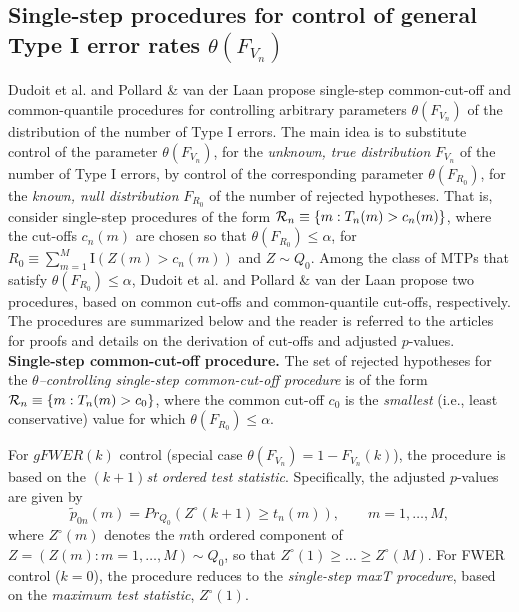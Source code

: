 \documentclass[11pt]{article}
\begin{document}
\subsection{Single-step procedures for control of general Type I error rates $\theta(F_{V_n})$}
\label{anal:mult:s:SS}


Dudoit et al. \cite{DudoitetalMT1SAGMB04} and Pollard \& van der Laan \cite{Pollard&vdLaanJSPI04} propose single-step common-cut-off and common-quantile procedures for controlling arbitrary parameters $\theta(F_{V_n})$ of the distribution of the number of Type I errors. 
The main idea is to substitute control of the parameter $\theta(F_{V_n})$, for the {\em  unknown, true distribution} $F_{V_n}$ of the number of Type I errors, by control of the corresponding parameter $\theta(F_{R_0})$, for the {\em known, null distribution} $F_{R_0}$ of the number of rejected hypotheses. 
That is, consider single-step procedures of the form ${\cal R}_n \equiv \{m: T_n(m)> c_n(m) \}$, 
where the cut-offs $c_n(m)$ are chosen so that $\theta(F_{R_0}) \leq
\alpha$, for $R_0 \equiv \sum_{m=1}^M \mathrm{I}(Z(m) >  c_n(m))$
and $Z \sim Q_0$.
Among the class of MTPs that satisfy $\theta(F_{R_0}) \leq \alpha$, 
Dudoit et al. \cite{DudoitetalMT1SAGMB04} and Pollard \& van der Laan \cite{Pollard&vdLaanJSPI04} propose two procedures, based on common cut-offs and common-quantile cut-offs, respectively. 
The procedures are summarized below and the reader is referred to the articles for proofs and details on the derivation of cut-offs and adjusted $p$-values.\\

\noindent
{\bf Single-step common-cut-off procedure.} The set of rejected hypotheses for the {\em $\theta$--controlling single-step common-cut-off procedure} is of the form
${\cal R}_n \equiv \{m: T_n(m)> c_0 \}$, where the common cut-off $c_0$ is the {\em smallest}  (i.e., least conservative) value for which $\theta(F_{R_0}) \leq \alpha$.

For $gFWER(k)$ control (special case $\theta(F_{V_n}) = 1 - F_{V_n}(k)$), the procedure is based on the {\em $(k+1)$st ordered test statistic}.  
Specifically, the adjusted $p$-values are given by
\begin{equation}\label{anal:mult:e:SScut}
\widetilde{p}_{0n}(m) = Pr_{Q_0} \left(Z^{\circ}(k+1) \geq t_n(m) \right),  \qquad m=1,\ldots, M,
\end{equation}
where $Z^{\circ}(m)$ denotes the $m$th ordered component of $Z = (Z(m): m=1,\ldots,M) \sim Q_0$, so that $Z^{\circ}(1) \geq \ldots \geq Z^{\circ}(M)$. 
For FWER control ($k=0$), the procedure reduces to the  {\em single-step maxT procedure}, based on the {\em maximum test statistic}, $Z^{\circ}(1)$.\\
\end{document}

